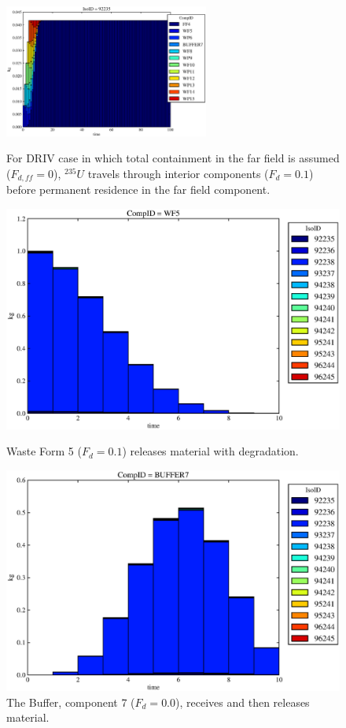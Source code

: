 \begin{figure}[ht]
\centering
\includegraphics[width=0.6\textwidth]{./chapters/demonstration/base/drIV.eps}
\caption[$^{235}U$ residence. Degradation Rate Buffer No Release.]{
For DRIV case in which total containment in the far field is assumed ($F_{d,ff}=0$), 
$^{235}U$ travels through interior components ($F_d = 0.1$) before 
permanent residence in the far field component.
}
\label{fig:drIVall}
\begin{minipage}[b]{0.45\linewidth}

  \includegraphics[width=\textwidth]{./chapters/demonstration/base/drIV1.eps}
  \caption[DRIII Waste Form Contaminants.]{
    Waste Form 5 ($F_d = 0.1$) releases material with degradation. 
    }
  \label{fig:drIVwf5}
  
  \includegraphics[width=\textwidth]{./chapters/demonstration/base/drIV3.eps}
  \caption[Case DRIII Buffer Contaminants]{
    The Buffer, component 7 ($F_d=0.0$), receives and then releases material.
    }
  \label{fig:drIVbuff}


\end{minipage}
\end{figure}
